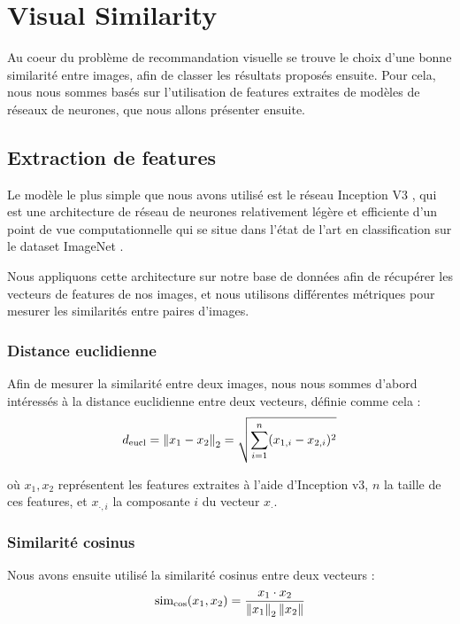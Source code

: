 \section{Visual Similarity}

Au coeur du problème de recommandation visuelle se trouve le choix d'une bonne similarité entre images, afin de classer
les résultats proposés ensuite. Pour cela, nous nous sommes basés sur l'utilisation de features extraites de modèles de
réseaux de neurones, que nous allons présenter ensuite.

\subsection{Extraction de features}

Le modèle le plus simple que nous avons utilisé est le réseau Inception V3 \cite{rethinking2015szegedy}, qui est une
architecture de réseau de neurones relativement légère et efficiente d'un point de vue computationnelle qui se situe
dans l'état de l'art en classification sur le dataset ImageNet \cite{imagenet_cvpr09}.

Nous appliquons cette architecture sur notre base de données afin de récupérer les vecteurs de features de nos images,
et nous utilisons différentes métriques pour mesurer les similarités entre paires d'images.

\subsubsection{Distance euclidienne}

Afin de mesurer la similarité entre deux images, nous nous sommes d'abord intéressés à la distance euclidienne entre
deux vecteurs, définie comme cela :
\begin{equation}
    d_{\text{eucl}} = \left\lVert x_1 - x_2\right\rVert_2 = \sqrt{\sum_{i=1}^n (x_{1,i} - x_{2,i})^2}
\end{equation}

où $x_1, x_2$ représentent les features extraites à l'aide d'Inception v3, $n$ la taille de ces features, et $x_{\cdot,
i}$ la composante $i$ du vecteur $x_{\cdot}$.

\subsubsection{Similarité cosinus}

Nous avons ensuite utilisé la similarité cosinus entre deux vecteurs :
\begin{equation}
    \operatorname*{sim_{cos}} (x_1, x_2) = \frac{x_1 \cdot x_2}{\left\lVert x_1\right\rVert_2 \left\lVert x_2\right\rVert}
\end{equation}

